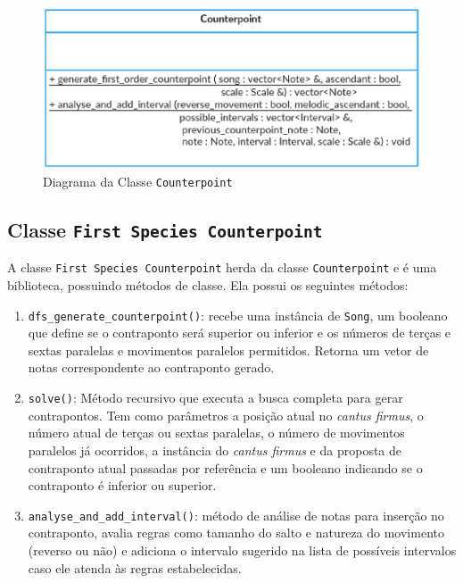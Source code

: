    \begin{figure}[htb]
      \centering
      \includegraphics[scale=0.7]{figuras/counterpointclass.eps}
      \caption{Diagrama da Classe \texttt{Counterpoint}}
      \label{counterpointclass}
    \end{figure}

    \subsection[Classe \texttt{First Species Counterpoint}]{Classe \texttt{First Species Counterpoint}} \label{ssec:fec}

      A classe \texttt{First Species Counterpoint} herda da classe \texttt{Counterpoint} e é uma biblioteca, possuindo métodos de classe. Ela possui os seguintes métodos:

      \begin{enumerate}
        \item \texttt{dfs\_generate\_counterpoint()}: recebe uma instância de \texttt{Song}, um booleano que define se o contraponto será superior ou inferior e os números de terças e sextas paralelas e movimentos paralelos permitidos. Retorna um vetor de notas correspondente ao contraponto gerado.
        \item \texttt{solve()}: Método recursivo que executa a busca completa para gerar contrapontos. Tem como parâmetros a posição atual no \textit{cantus firmus}, o número atual de terças ou sextas paralelas, o número de movimentos paralelos já ocorridos, a instância do \textit{cantus firmus} e da proposta de contraponto atual passadas por referência e um booleano indicando se o contraponto é inferior ou superior.
        \item \texttt{analyse\_and\_add\_interval()}: método de análise de notas para inserção no contraponto, avalia regras como tamanho do salto e natureza do movimento (reverso ou não) e adiciona o intervalo sugerido na lista de possíveis intervalos caso ele atenda às regras estabelecidas.
      \end{enumerate}

